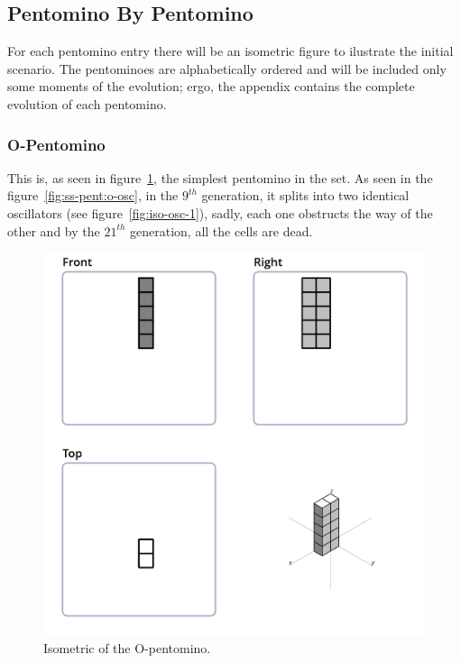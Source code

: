 
\subsection{Pentomino By Pentomino}
For each pentomino entry there will be an isometric figure to ilustrate the
initial scenario. The pentominoes are alphabetically ordered and will be included
only some moments of the evolution; ergo, the appendix contains the complete
evolution of each pentomino.

\subsubsection{O-Pentomino}
\label{sec:o-pentomino}

This is, as seen in figure~\ref{fig:iso-pent-o}, the simplest pentomino in the
set. As seen in the figure~\ref{fig:ss-pent:o-osc}, in the $9^{th}$ generation,
it splits into two identical oscillators (see figure~\ref{fig:iso-osc-1}),
sadly, each one obstructs the way of the other and by the $21^{th}$ generation,
all the cells are dead.

\begin{figure}
	\centering
	\includegraphics[scale=0.3]{iso_diagrams/o.png}
	\caption{Isometric of the O-pentomino.}
  \label{fig:iso-pent-o}
\end{figure}

